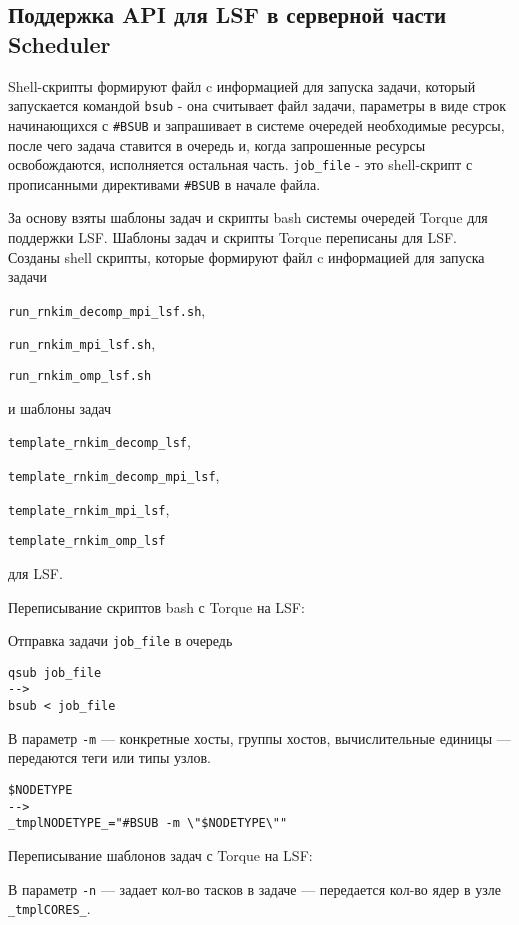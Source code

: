 \subsection{Поддержка API для LSF в серверной части Scheduler}

Shell-скрипты формируют файл c информацией для запуска задачи, который запускается командой \lstinline{bsub} - она считывает файл задачи, параметры в виде строк начинающихся с \lstinline{#BSUB} и запрашивает в системе очередей необходимые ресурсы, после чего задача ставится в очередь и, когда запрошенные ресурсы освобождаются, исполняется остальная часть. \lstinline{job_file} - это shell-скрипт с прописанными директивами \lstinline{#BSUB} в начале файла.

За основу взяты шаблоны задач и скрипты bash системы очередей Torque для поддержки LSF. Шаблоны задач и скрипты Torque переписаны для LSF. Созданы shell скрипты, которые формируют файл c информацией для запуска задачи

\lstinline{run_rnkim_decomp_mpi_lsf.sh},

\lstinline{run_rnkim_mpi_lsf.sh},

\lstinline{run_rnkim_omp_lsf.sh}

и шаблоны задач

\lstinline{template_rnkim_decomp_lsf},

\lstinline{template_rnkim_decomp_mpi_lsf},

\lstinline{template_rnkim_mpi_lsf},

\lstinline{template_rnkim_omp_lsf}

для LSF.

Переписывание скриптов bash с Torque на LSF:

{
Отправка задачи \lstinline{job_file} в очередь 

\begin{lstlisting}
qsub job_file
-->
bsub < job_file
\end{lstlisting}
}

В параметр \lstinline{-m} --- конкретные хосты, группы хостов, вычислительные единицы --- передаются теги или типы узлов.

\begin{lstlisting}
$NODETYPE
-->
_tmplNODETYPE_="#BSUB -m \"$NODETYPE\""
\end{lstlisting}

Переписывание шаблонов задач с Torque на LSF:

В параметр \lstinline{-n} --- задает кол-во тасков в задаче --- передается кол-во ядер в узле \lstinline{_tmplCORES_}.

